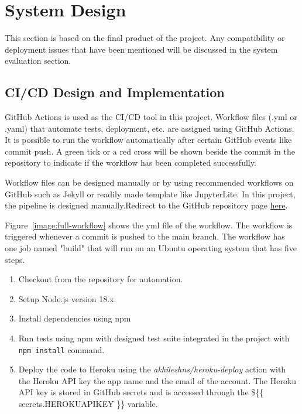 \chapter{System Design}

This section is based on the final product of the project. Any compatibility or deployment issues that have been mentioned will be discussed in the system evaluation section.

\section{CI/CD Design and Implementation}
GitHub Actions is used as the CI/CD tool in this project. Workflow files (.yml or .yaml) that automate tests, deployment, etc. are assigned using GitHub Actions. It is possible to run the workflow automatically after certain GitHub events like commit push. A green tick or a red cross will be shown beside the commit in the repository to indicate if the workflow has been completed successfully.

Workflow files can be designed manually or by using recommended workflows on GitHub such as Jekyll or readily made template like JupyterLite. In this project, the pipeline is designed manually.Redirect to the GitHub repository page \href{https://github.com/gabhang/final-year-project}{here}.

Figure~\ref{image:full-workflow} shows the yml file of the workflow. The workflow is triggered whenever a commit is pushed to the main branch. The workflow has one job named "build" that will run on an Ubuntu operating system that has five steps. 

\begin{enumerate}
  \item Checkout from the repository for automation.
  \item Setup Node.js version 18.x.
  \item Install dependencies using npm
  \item Run tests using npm with designed test suite integrated in the project with \texttt{npm install} command.
  \item Deploy the code to Heroku using the \textit{akhileshns/heroku-deploy} action with the Heroku API key the app name and the email of the account. The Heroku API key is stored in GitHub secrets and is accessed through the \$\{\{ secrets.HEROKU\textunderscore API\textunderscore KEY \}\} variable.
\end{enumerate}


